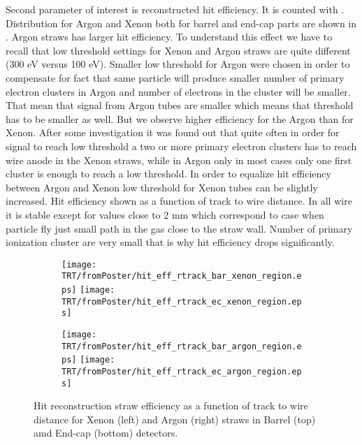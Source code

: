 Second parameter of interest is reconstructed hit efficiency. It is counted with .
Distribution for Argon and Xenon both for barrel and end-cap parts are shown in .
Argon straws has larger hit efficiency. To understand this effect we have to recall that low threshold settings
for Xenon and Argon straws are quite different (300 eV versus 100 eV). Smaller low threshold for Argon were chosen 
in order to compensate for fact that same particle will produce smaller number of primary electron clusters in Argon 
and number of electrons in the cluster will be smaller. That mean that signal from Argon tubes are smaller which means
that threshold has to be smaller as well. But we observe higher efficiency for the Argon than for Xenon. After some investigation
it was found out that quite often in order for signal to reach low threshold a two or more primary electron clusters has to reach wire anode in
the Xenon straws, while in Argon only in most cases only one first cluster is enough to reach a low threshold.
In order to equalize hit efficiency between Argon and Xenon low threshold for Xenon tubes can be slightly increased.
Hit efficiency shown as a function of track to wire distance. In all wire it is stable except for values close to 2 mm which correspond
to case when particle fly just small path in the gas close to the straw wall. Number of primary ionization cluster are very small that is 
why hit efficiency drops significantly.

\begin{figure}

\begin{subfigure}{.5\textwidth}
  \centering
  \texttt{[image: TRT/fromPoster/hit\_eff\_rtrack\_bar\_xenon\_region.eps]}
  \texttt{[image: TRT/fromPoster/hit\_eff\_rtrack\_ec\_xenon\_region.eps]}
\end{subfigure}%
\begin{subfigure}{.5\textwidth}
  \centering
  \texttt{[image: TRT/fromPoster/hit\_eff\_rtrack\_bar\_argon\_region.eps]}
  \texttt{[image: TRT/fromPoster/hit\_eff\_rtrack\_ec\_argon\_region.eps]}
\end{subfigure}

\caption{Hit reconstruction straw efficiency as a function of track to wire distance 
for Xenon (left) and Argon (right) straws in Barrel (top) amd End-cap (bottom) detectors.}
  \label{fig:hit_eff_rtrack_bar}
\end{figure}

